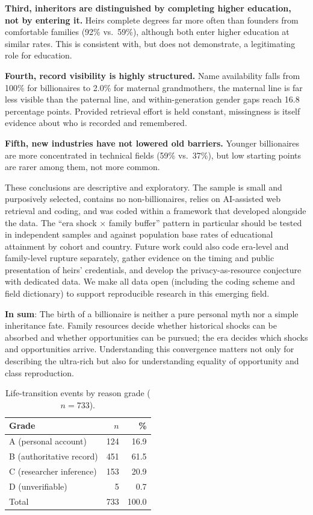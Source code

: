 \documentclass[11pt,a4paper]{article}
\begin{document}
\textbf{Third, inheritors are distinguished by completing higher education, not by entering it.} Heirs complete degrees far more often than founders from comfortable families (92\% vs.\ 59\%), although both enter higher education at similar rates. This is consistent with, but does not demonstrate, a legitimating role for education.

\textbf{Fourth, record visibility is highly structured.} Name availability falls from 100\% for billionaires to 2.0\% for maternal grandmothers, the maternal line is far less visible than the paternal line, and within-generation gender gaps reach 16.8 percentage points. Provided retrieval effort is held constant, missingness is itself evidence about who is recorded and remembered.

\textbf{Fifth, new industries have not lowered old barriers.} Younger billionaires are more concentrated in technical fields (59\% vs.\ 37\%), but low starting points are rarer among them, not more common.

These conclusions are descriptive and exploratory. The sample is small and purposively selected, contains no non-billionaires, relies on AI-assisted web retrieval and coding, and was coded within a framework that developed alongside the data. The ``era shock $\times$ family buffer'' pattern in particular should be tested in independent samples and against population base rates of educational attainment by cohort and country. Future work could also code era-level and family-level rupture separately, gather evidence on the timing and public presentation of heirs' credentials, and develop the privacy-as-resource conjecture with dedicated data. We make all data open (including the coding scheme and field dictionary) to support reproducible research in this emerging field.

\textbf{In sum}: The birth of a billionaire is neither a pure personal myth nor a simple inheritance fate. Family resources decide whether historical shocks can be absorbed and whether opportunities can be pursued; the era decides which shocks and opportunities arrive. Understanding this convergence matters not only for describing the ultra-rich but also for understanding equality of opportunity and class reproduction.

\begin{table}[htbp]
\centering
\caption{Life-transition events by reason grade ($n=733$).}
\label{tab:events}
\small
\begin{tabular}{lrr}
\toprule
Grade & $n$ & \% \\
\midrule
A (personal account) & 124 & 16.9 \\
B (authoritative record) & 451 & 61.5 \\
C (researcher inference) & 153 & 20.9 \\
D (unverifiable) & 5 & 0.7 \\
\midrule
Total & 733 & 100.0 \\
\bottomrule
\end{tabular}
\end{table}
\end{document}
